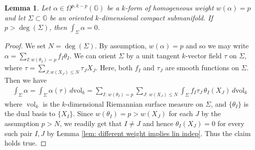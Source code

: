\documentclass[dvipsnames]{amsart}
\newtheorem{lemma}[theorem]{Lemma}
\theoremstyle{definition}
\theoremstyle{definition}
\numberwithin{equation}{section}
\newcommand{\G}{\mathbb{G}}
\begin{document}
\begin{lemma}\label{lem: forms of higher weight, integral vanishes}
Let $\alpha\in\Omega^{p,k-p}(\G)$ be a $k$-form of homogeneous weight $w(\alpha)=p$ and let $\Sigma\subset\G$ be an oriented $k$-dimensional compact submanifold. 
If $p>\deg(\Sigma)$, then $\int_\Sigma\alpha=0$.
\end{lemma}
\begin{proof}
We set $N=\deg(\Sigma)$. By assumption, $w(\alpha)=p$ and so we may write $\alpha=\sum_{I\colon w(\theta_I)=p}f_I\theta_I$. We can orient $\Sigma$ by a unit tangent $k$-vector field $\tau$ on $\Sigma$, where $\tau=\sum_{J\colon w(X_J)\le N}\tau_JX_J$. Here, both $f_I$ and $\tau_J$ are smooth functions on $\Sigma$. Then we have
    \begin{align*}
        \int_\Sigma\alpha=
\int_\Sigma \alpha(\tau)\,d\mathrm{vol}_k=
\sum_{I:\,w(\theta_I)=p}
\sum_{J:\,w(X_J)\le N}
\int_\Sigma f_I\tau_J\,\theta_I(X_J)\,d\mathrm{vol}_k
    \end{align*}
    where $\operatorname{vol}_k$ is the $k$-dimensional Riemannian surface measure on $\Sigma$, and \(\{\theta_I\}\) is the dual basis to \(\{X_I\}\). Since \(w(\theta_I)=p>w(X_J)\) for each $J$ by the assumption $p>N$, we readily get that \(I\neq J\) and hence $\theta_I(X_J)=0$ for every such pair $I,J$ by Lemma \ref{lem: different weight implies lin indep}. Thus the claim holds true.
\end{proof}
\end{document}
